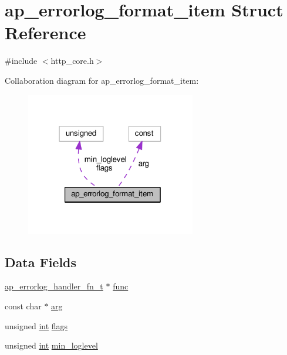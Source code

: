 \hypertarget{structap__errorlog__format__item}{}\section{ap\+\_\+errorlog\+\_\+format\+\_\+item Struct Reference}
\label{structap__errorlog__format__item}


{\ttfamily \#include $<$http\+\_\+core.\+h$>$}



Collaboration diagram for ap\+\_\+errorlog\+\_\+format\+\_\+item\+:
\nopagebreak
\begin{figure}[H]
\begin{center}
\leavevmode
\includegraphics[width=210pt]{structap__errorlog__format__item__coll__graph}
\end{center}
\end{figure}
\subsection*{Data Fields}
\begin{DoxyCompactItemize}
\item 
\hyperlink{group__APACHE__CORE__HTTPD_gae2b87862d08783b06d2f1b6dfb161bca}{ap\+\_\+errorlog\+\_\+handler\+\_\+fn\+\_\+t} $\ast$ \hyperlink{structap__errorlog__format__item_a86f08396ad2fe98dc586db7772af89ba}{func}
\item 
const char $\ast$ \hyperlink{structap__errorlog__format__item_aa79fed10aa4fc2d1497e9733e61c312a}{arg}
\item 
unsigned \hyperlink{pcre_8txt_a42dfa4ff673c82d8efe7144098fbc198}{int} \hyperlink{structap__errorlog__format__item_a0fac03645d039138551da4678c338c5a}{flags}
\item 
unsigned \hyperlink{pcre_8txt_a42dfa4ff673c82d8efe7144098fbc198}{int} \hyperlink{structap__errorlog__format__item_afa953d1d14bb4dea3a444e374a1d0e80}{min\+\_\+loglevel}
\end{DoxyCompactItemize}


